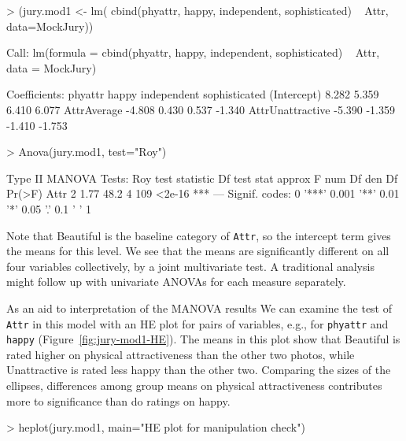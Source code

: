 \documentclass[11pt]{article}
\newcommand{\figref}[1]{Figure~\ref{#1}}
\newcommand{\code}[1]{{\texttt{#1}}}
\begin{document}
\begin{Schunk}
\begin{Sinput}
> (jury.mod1 <- lm( cbind(phyattr, happy, independent, sophisticated) ~ Attr, data=MockJury))
\end{Sinput}
\begin{Soutput}
Call:
lm(formula = cbind(phyattr, happy, independent, sophisticated) ~ 
    Attr, data = MockJury)

Coefficients:
                  phyattr  happy   independent  sophisticated
(Intercept)        8.282    5.359   6.410        6.077       
AttrAverage       -4.808    0.430   0.537       -1.340       
AttrUnattractive  -5.390   -1.359  -1.410       -1.753       
\end{Soutput}
\begin{Sinput}
> Anova(jury.mod1, test="Roy")
\end{Sinput}
\begin{Soutput}
Type II MANOVA Tests: Roy test statistic
     Df test stat approx F num Df den Df Pr(>F)    
Attr  2      1.77     48.2      4    109 <2e-16 ***
---
Signif. codes:  0 '***' 0.001 '**' 0.01 '*' 0.05 '.' 0.1 ' ' 1 
\end{Soutput}
\end{Schunk}
Note that Beautiful is the baseline category of \code{Attr}, so the
intercept term gives the means for this level.
We see that the means are significantly different on all four variables
collectively, by a joint multivariate test.  A traditional analysis might
follow up with univariate ANOVAs for each measure separately. 

As an aid to interpretation of the MANOVA results
We can examine the test of \code{Attr} in this model with an HE plot for
pairs of variables, e.g., for \code{phyattr} and  \code{happy} (\figref{fig:jury-mod1-HE}).
The means in this plot show that Beautiful is rated higher on
physical attractiveness than the other two photos, while Unattractive
is rated less happy than the other two. Comparing the sizes of the
ellipses, differences among group means on physical attractiveness
contributes more to significance than do ratings on happy.

\begin{Schunk}
\begin{Sinput}
> heplot(jury.mod1, main="HE plot for manipulation check")
\end{Sinput}
\end{Schunk}
\end{document}
